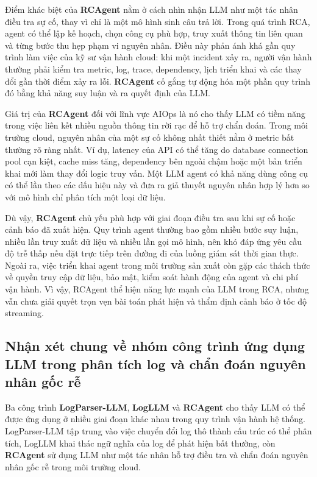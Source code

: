 Điểm khác biệt của \textbf{RCAgent} nằm ở cách nhìn nhận LLM như một tác nhân điều tra sự cố, thay vì chỉ là một mô hình sinh câu trả lời. Trong quá trình RCA, agent có thể lập kế hoạch, chọn công cụ phù hợp, truy xuất thông tin liên quan và từng bước thu hẹp phạm vi nguyên nhân. Điều này phản ánh khá gần quy trình làm việc của kỹ sư vận hành cloud: khi một incident xảy ra, người vận hành thường phải kiểm tra metric, log, trace, dependency, lịch triển khai và các thay đổi gần thời điểm xảy ra lỗi. \textbf{RCAgent} cố gắng tự động hóa một phần quy trình đó bằng khả năng suy luận và ra quyết định của LLM.

Giá trị của \textbf{RCAgent} đối với lĩnh vực AIOps là nó cho thấy LLM có tiềm năng trong việc liên kết nhiều nguồn thông tin rời rạc để hỗ trợ chẩn đoán. Trong môi trường cloud, nguyên nhân của một sự cố không nhất thiết nằm ở metric bất thường rõ ràng nhất. Ví dụ, latency của API có thể tăng do database connection pool cạn kiệt, cache miss tăng, dependency bên ngoài chậm hoặc một bản triển khai mới làm thay đổi logic truy vấn. Một LLM agent có khả năng dùng công cụ có thể lần theo các dấu hiệu này và đưa ra giả thuyết nguyên nhân hợp lý hơn so với mô hình chỉ phân tích một loại dữ liệu.

Dù vậy, \textbf{RCAgent} chủ yếu phù hợp với giai đoạn điều tra sau khi sự cố hoặc cảnh báo đã xuất hiện. Quy trình agent thường bao gồm nhiều bước suy luận, nhiều lần truy xuất dữ liệu và nhiều lần gọi mô hình, nên khó đáp ứng yêu cầu độ trễ thấp nếu đặt trực tiếp trên đường đi của luồng giám sát thời gian thực. Ngoài ra, việc triển khai agent trong môi trường sản xuất còn gặp các thách thức về quyền truy cập dữ liệu, bảo mật, kiểm soát hành động của agent và chi phí vận hành. Vì vậy, RCAgent thể hiện năng lực mạnh của LLM trong RCA, nhưng vẫn chưa giải quyết trọn vẹn bài toán phát hiện và thẩm định cảnh báo ở tốc độ streaming.
\subsection*{Nhận xét chung về nhóm công trình ứng dụng LLM trong phân tích log và chẩn đoán nguyên nhân gốc rễ}
Ba công trình \textbf{LogParser-LLM}, \textbf{LogLLM} và \textbf{RCAgent} cho thấy LLM có thể được ứng dụng ở nhiều giai đoạn khác nhau trong quy trình vận hành hệ thống. LogParser-LLM tập trung vào việc chuyển đổi log thô thành cấu trúc có thể phân tích, LogLLM khai thác ngữ nghĩa của log để phát hiện bất thường, còn \textbf{RCAgent} sử dụng LLM như một tác nhân hỗ trợ điều tra và chẩn đoán nguyên nhân gốc rễ trong môi trường cloud.

